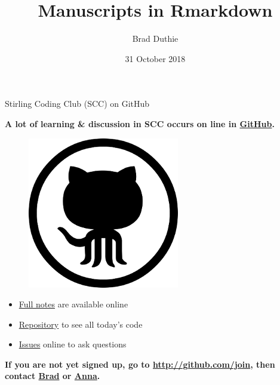 \documentclass[ignorenonframetext,]{beamer}
\title{Manuscripts in Rmarkdown}
\author{Brad Duthie}
\date{31 October 2018}
\providecommand{\tightlist}{%
\setlength{\itemsep}{0pt}\setlength{\parskip}{0pt}}
\begin{document}
\frame{\titlepage}

\begin{frame}

\end{frame}

\begin{frame}{Stirling Coding Club (SCC) on GitHub}

\textbf{A lot of learning \& discussion in SCC occurs on line in
\href{http://github.com}{GitHub}.}

\begin{figure}[htbp]
\centering
\includegraphics{images/github_logo.png}
\caption{}
\end{figure}

\begin{itemize}
\tightlist
\item
  \href{https://stirlingcodingclub.github.io/Manuscripts_in_Rmarkdown/Rmarkdown_notes.html}{Full
  notes} are available online
\item
  \href{https://github.com/StirlingCodingClub/Manuscripts_in_Rmarkdown}{Repository}
  to see all today's code
\item
  \href{https://github.com/StirlingCodingClub/Manuscripts_in_Rmarkdown/issues}{Issues}
  online to ask questions
\end{itemize}

\textbf{If you are not yet signed up, go to
\url{http://github.com/join}, then contact
\href{https://bradduthie.github.io/}{Brad} or
\href{https://www.stir.ac.uk/people/266756}{Anna}.}

\end{frame}
\end{document}
